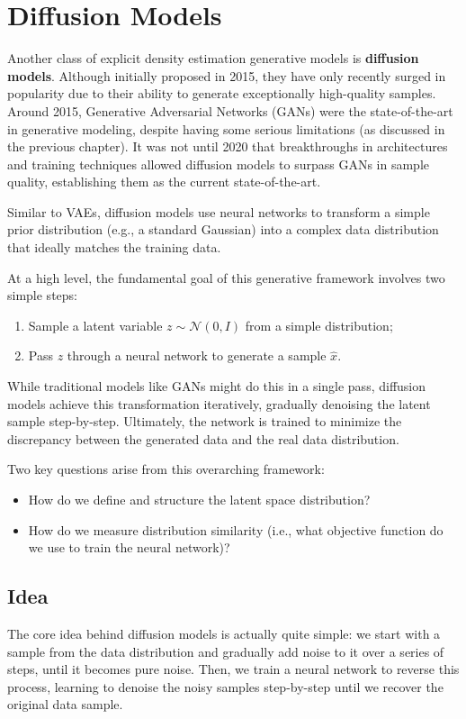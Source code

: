 \section{Diffusion Models}
Another class of explicit density estimation generative models is \textbf{diffusion models}. 
Although initially proposed in 2015, they have only recently surged in popularity due to their ability to generate exceptionally high-quality samples. 
Around 2015, Generative Adversarial Networks (GANs) were the state-of-the-art in generative modeling, despite having some serious limitations (as discussed in the previous chapter). 
It was not until 2020 that breakthroughs in architectures and training techniques allowed diffusion models to surpass GANs in sample quality, establishing them as the current state-of-the-art.

Similar to VAEs, diffusion models use neural networks to transform a simple prior distribution (e.g., a standard Gaussian) into a complex data distribution that ideally matches the training data.

At a high level, the fundamental goal of this generative framework involves two simple steps:
\begin{enumerate}
    \item Sample a latent variable $z \sim \mathcal{N}(0, I)$ from a simple distribution;
    \item Pass $z$ through a neural network to generate a sample $\hat{x}$.
\end{enumerate}

While traditional models like GANs might do this in a single pass, diffusion models achieve this transformation iteratively, gradually denoising the latent sample step-by-step. Ultimately, the network is trained to minimize the discrepancy between the generated data and the real data distribution.

Two key questions arise from this overarching framework:
\begin{itemize}
    \item How do we define and structure the latent space distribution?
    \item How do we measure distribution similarity (i.e., what objective function do we use to train the neural network)?
\end{itemize}

\subsection{Idea}
The core idea behind diffusion models is actually quite simple: 
we start with a sample from the data distribution and gradually add noise to it over a series of steps, until it becomes pure noise. 
Then, we train a neural network to reverse this process, learning to denoise the noisy samples step-by-step until we recover the original data sample.

